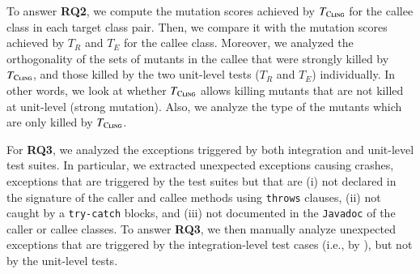 To answer \textbf{RQ2}, we compute the mutation scores achieved by $T_{\textsc{Cling}}$ for the callee class in each target class pair. Then, we compare it with the mutation scores achieved by $T_R$ and $T_E$ for the callee class. Moreover, we analyzed the orthogonality of the sets of mutants in the callee that were strongly killed by $T_{\textsc{Cling}}$, and those killed by the two unit-level tests ($T_{R}$ and $T_{E}$) individually. In other words, we look at whether $T_{\textsc{Cling}}$ allows killing mutants that are not killed at unit-level (strong mutation). Also, we analyze the type of the mutants which are only killed by $T_{\textsc{Cling}}$.


For \textbf{RQ3}, we analyzed the exceptions triggered by both integration and unit-level test suites. In particular, we extracted unexpected exceptions causing crashes, \ie exceptions that are triggered by the test suites but that are 
(i) not declared in the signature of the caller and callee methods using \texttt{throws} clauses, 
(ii) not caught by a \texttt{try-catch} blocks, and
(iii) not documented in the \texttt{Javadoc} of the caller or callee classes.  To answer \textbf{RQ3}, we then manually analyze unexpected exceptions that are triggered by the integration-level test cases (i.e., by \cling), but not by the unit-level tests. 




